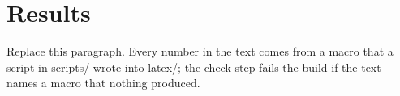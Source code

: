 \section{Results}

Replace this paragraph. Every number in the text comes from a macro that a script in scripts/ wrote into latex/;
the check step fails the build if the text names a macro that nothing produced.

\begin{table}[htbp]
	\centering
	\caption{An example of a generated table. The caption is written by hand here, next to the item it describes,
		while the body comes from latex/ and is overwritten on every run; a caption that states a number states it
		with a macro, as this one does: \DemoNSamples{} samples.}
	\label{tab:demo}
\end{table}
